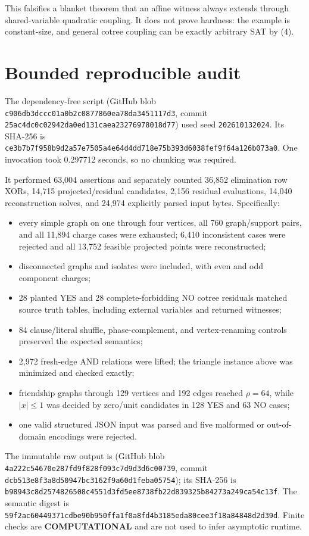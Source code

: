 \documentclass[11pt]{article}
\newcommand{\COMP}{\textbf{COMPUTATIONAL}}
\begin{document}
This falsifies a blanket theorem that an affine witness always extends through
shared-variable quadratic coupling.  It does not prove hardness: the example
is constant-size, and general cotree coupling can be exactly arbitrary SAT by
(4).

\section{Bounded reproducible audit}
The dependency-free script
(GitHub blob \texttt{c906db3dccc01a0b2c0877860ea78da3451117d3}, commit
\texttt{25ac4dc0c02942da0ed131caea23276978018d77}) used seed
\texttt{202610132024}.  Its SHA-256 is
\texttt{ce3b7b7f958b9d2a57e7505a4e64d4dd718e75b393d6038fef9f64a126b073a0}.
One invocation took 0.297712 seconds, so no chunking was required.

It performed 63,004 assertions and separately counted 36,852 elimination row
XORs, 14,715 projected/residual candidates, 2,156 residual evaluations,
14,040 reconstruction solves, and 24,974 explicitly parsed input bytes.
Specifically:
\begin{itemize}
\item every simple graph on one through four vertices, all 760 graph/support
pairs, and all 11,894 charge cases were exhausted; 6,410 inconsistent cases
were rejected and all 13,752 feasible projected points were reconstructed;
\item disconnected graphs and isolates were included, with even and odd
component charges;
\item 28 planted YES and 28 complete-forbidding NO cotree residuals matched
source truth tables, including external variables and returned witnesses;
\item 84 clause/literal shuffle, phase-complement, and vertex-renaming controls
preserved the expected semantics;
\item 2,972 fresh-edge AND relations were lifted; the triangle instance above
was minimized and checked exactly;
\item friendship graphs through 129 vertices and 192 edges reached
$\rho=64$, while $|x|\le1$ was decided by zero/unit candidates in 128 YES and
63 NO cases;
\item one valid structured JSON input was parsed and five malformed or
out-of-domain encodings were rejected.
\end{itemize}

The immutable raw output is
(GitHub blob \texttt{4a222c54670e287fd9f828f093c7d9d3d6c00739}, commit
\texttt{dcb513e8f3a8d50947bc3162f9a60d1feba05754}); its SHA-256 is
\texttt{b98943c8d2574826508c4551d3fd5ee8738fb22d839325b84273a249ca54c13f}.
The semantic digest is
\texttt{59f2ac60449371cdbe90b950ffa1f0a8fd4b3185eda80cee3f18a84848d2d39d}.
Finite checks are \COMP{} and are not used to infer asymptotic runtime.
\end{document}
